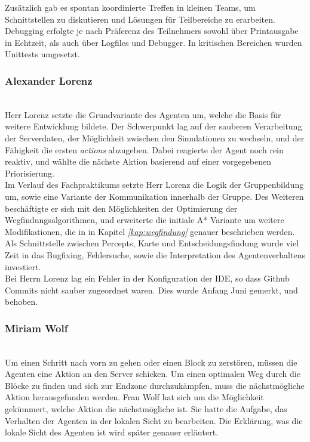 Zusätzlich gab es spontan koordinierte Treffen in kleinen Teams, um Schnittstellen zu diskutieren und Lösungen für Teilbereiche zu erarbeiten. \\

Debugging erfolgte je nach Präferenz des Teilnehmers sowohl über Printausgabe in Echtzeit, als auch über Logfiles und Debugger. In kritischen Bereichen wurden Unittests umgesetzt. 

\subsubsection{Alexander Lorenz} ~\\
Herr Lorenz setzte die Grundvariante des Agenten um, welche die Basis für weitere Entwicklung bildete. Der Schwerpunkt lag auf der sauberen Verarbeitung der Serverdaten, der Möglichkeit zwischen den Simulationen zu wechseln, und der Fähigkeit die ersten \textit{actions} abzugeben. Dabei reagierte der Agent noch rein reaktiv, und wählte die nächste Aktion basierend auf einer vorgegebenen Priorisierung. \\

Im Verlauf des Fachpraktikums setzte Herr Lorenz die Logik der Gruppenbildung um, sowie eine Variante der Kommunikation innerhalb der Gruppe. Des Weiteren beschäftigte er sich mit den Möglichkeiten der Optimierung der Wegfindungsalgorithmen, und erweiterte die initiale A* Variante um weitere Modifikationen, die in in Kapitel \textit{\ref{kap:wegfindung}} genauer beschrieben werden. Als Schnittstelle zwischen Percepts, Karte und Entscheidungsfindung wurde viel Zeit in das Bugfixing, Fehlersuche, sowie die Interpretation des Agentenverhaltens investiert. \\

Bei Herrn Lorenz lag ein Fehler in der Konfiguration der IDE, so dass Github Commits nicht sauber zugeordnet waren. Dies wurde Anfang Juni gemerkt, und behoben.  

\subsubsection{Miriam Wolf} ~\\
Um einen Schritt nach vorn zu gehen oder einen Block zu zerstören, müssen die Agenten eine Aktion an den Server schicken. Um einen optimalen Weg durch die Blöcke zu finden und sich zur Endzone durchzukämpfen, muss die nächstmögliche Aktion herausgefunden werden. Frau Wolf hat sich um die Möglichkeit gekümmert, welche Aktion die nächstmögliche ist. Sie hatte die Aufgabe, das Verhalten der Agenten in der lokalen Sicht zu bearbeiten. Die Erklärung, was die lokale Sicht des Agenten ist wird später genauer erläutert. \\

